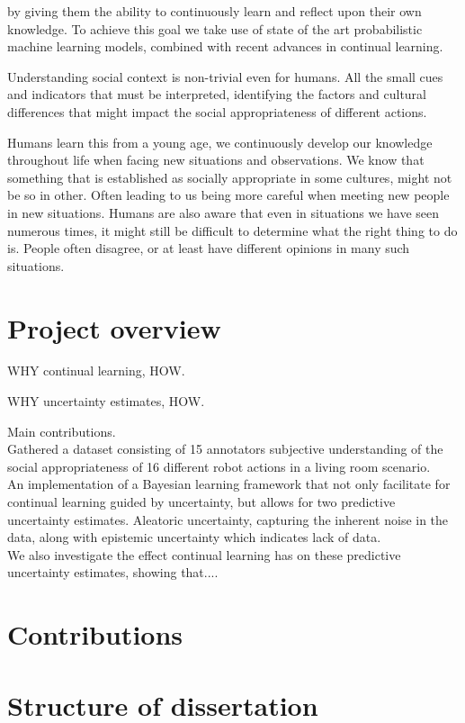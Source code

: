 \documentclass[a4paper,12pt]{report}
\begin{document}
by giving them the ability to continuously learn and reflect upon their own knowledge. To achieve this goal we take use of state of the art probabilistic machine learning models, combined with recent advances in continual learning.

Understanding social context is non-trivial even for humans. All the small cues and indicators that must be interpreted, identifying the factors and cultural differences that might impact the social appropriateness of different actions.

Humans learn this from a young age, we continuously develop our knowledge throughout life when facing new situations and observations. We know that something that is established as socially appropriate in some cultures, might not be so in other. Often leading to us being more careful when meeting new people in new situations. Humans are also aware that even in situations we have seen numerous times, it might still be difficult to determine what the right thing to do is. People often disagree, or at least have different opinions in many such situations.

\section{Project overview}
WHY continual learning, HOW.

WHY uncertainty estimates, HOW.

Main contributions.
\\
Gathered a dataset consisting of 15 annotators subjective understanding of the social appropriateness of 16 different robot actions in a living room scenario.
\\
An implementation of a Bayesian learning framework that not only facilitate for continual learning guided by uncertainty, but allows for two predictive uncertainty estimates. Aleatoric uncertainty, capturing the inherent noise in the data, along with epistemic uncertainty which indicates lack of data.
\\
We also investigate the effect continual learning has on these predictive uncertainty estimates, showing that....

\section{Contributions}

\section{Structure of dissertation}
\end{document}
